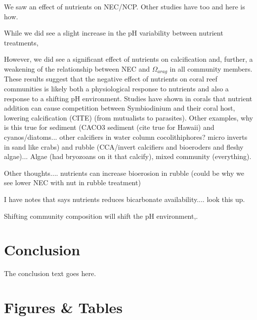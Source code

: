 \documentclass{article}%
\begin{document}
We saw an effect of nutrients on NEC/NCP.  Other studies have too and here is how.

While we did see a slight increase in the pH variability between nutrient treatments, 

However, we did see a significant effect of nutrients on calcification and, further, a weakening of the relationship between NEC and $\Omega_{arag}$ in all community members. These results suggest that the negative effect of nutrients on coral reef communities is likely both a physiological response to nutrients and also a response to a shifting pH environment. Studies have shown in corals that nutrient addition can cause competition between Symbiodinium and their coral host, lowering calcification (CITE) (from mutualists to parasites).  Other examples, why is this true for sediment (CACO3 sediment (cite true for Hawaii) and cyanos/diatoms... other calcifiers in water column cocolithiphores? micro inverts in sand like crabs) and rubble (CCA/invert calcifiers and bioeroders and fleshy algae)...  Algae (had bryozoans on it that calcify), mixed community (everything). 

Other thoughts.... nutrients can increase bioerosion in rubble (could be why we see lower NEC with nut in rubble treatment)

I have notes that says nutrients reduces bicarbonate availability.... look this up.

Shifting community composition will shift the pH environment,. 

\section{Conclusion}
The conclusion text goes here.




\section{Figures \& Tables}
\end{document}

